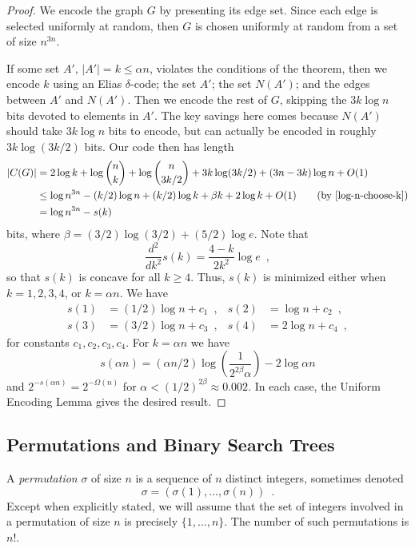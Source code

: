 \documentclass{patmorin}
\begin{document}
\begin{proof}
  We encode the graph $G$ by presenting its edge set. Since each edge
  is selected uniformly at random, then $G$ is chosen uniformly at
  random from a set of size $n^{3n}$.

  If some set $A'$, $|A'|=k\le \alpha n$, violates the conditions of
  the theorem, then we encode $k$ using an Elias $\delta$-code; the
  set $A'$; the set $N(A')$; and the edges between $A'$ and
  $N(A')$. Then we encode the rest of $G$, skipping the $3k\log n$
  bits devoted to elements in $A'$.  The key savings here comes
  because $N(A')$ should take $3k\log n$ bits to encode, but can
  actually be encoded in roughly $3k\log(3k/2)$ bits. Our code then
  has length
  \begin{align*}
    |C(G)| &= 2\log k + \log {n \choose k} + \log {n \choose 3k/2} + 3k \log (3k/2) + (3n - 3k)\log n + O(1) \\
           &\leq \log n^{3n} - (k/2)\log n + (k/2)\log k + \beta k + 2 \log k + O(1) \tag{by \eqref{log-n-choose-k}}\\
           &= \log n^{3n} - s(k)
  \end{align*}
  bits, where $\beta = (3/2) \log (3/2) + (5/2) \log e$. Note that
  \[
    \frac{d^2}{dk^2} s(k) = \frac{4 - k}{2 k^2} \log e \enspace ,
  \]
  so that $s(k)$ is concave for all $k \geq 4$. Thus, $s(k)$ is
  minimized either when $k = 1, 2, 3, 4$, or $k = \alpha n$. We have
  \begin{align*}
    s(1) &= (1/2)\log n + c_1 \enspace , & 
    s(2) &= \log n + c_2 \enspace , \\
    s(3) &= (3/2) \log n + c_3 \enspace , &
    s(4) &= 2 \log n + c_4 \enspace ,
  \end{align*}
  for constants $c_1, c_2, c_3, c_4$. For $k=\alpha n$ we have
  \[
    s(\alpha n) = (\alpha n/2)\log \left(\frac{1}{2^{2\beta}
        \alpha}\right) - 2 \log \alpha n
  \]
  and $2^{-s(\alpha n)} = 2^{-\Omega(n)}$ for $\alpha < (1/2)^{2\beta}
  \approx 0.002$. In each case, the Uniform Encoding Lemma gives the
  desired result.
\end{proof}

\subsection{Permutations and Binary Search Trees}

A \emph{permutation} $\sigma$ of size $n$ is a sequence of $n$
distinct integers, sometimes denoted
\[
  \sigma = (\sigma(1), \ldots, \sigma(n)) \enspace .
\]
Except when explicitly stated, we will assume that the set of integers
involved in a permutation of size $n$ is precisely $\{1, \ldots,
n\}$. The number of such permutations is $n!$.
\end{document}
